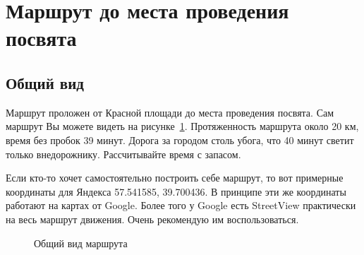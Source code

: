 \documentclass[a4paper, 12pt]{extarticle}
\begin{document}
\section*{Маршрут до места проведения посвята}
\subsection*{Общий вид}
\par Маршрут проложен от Красной площади до места проведения посвята. Сам маршрут Вы можете видеть на рисунке~\ref{ris:generalRoute}. Протяженность маршрута около 20 км, время без пробок 39 минут. Дорога за городом столь убога, что 40 минут светит только внедорожнику. Рассчитывайте время с запасом.

\par Если кто-то хочет самостоятельно построить себе маршрут, то вот примерные координаты для Яндекса 57.541585, 39.700436. В принципе эти же координаты работают на картах от Google. Более того у Google есть StreetView практически на весь маршрут движения. Очень рекомендую им воспользоваться.
\begin{figure}[h!]
	\caption{Общий вид маршрута}
	\label{ris:generalRoute}
\end{figure}

\newpage
\end{document}
